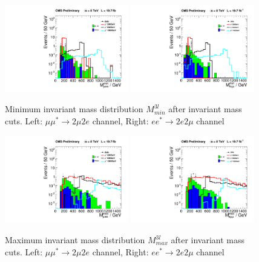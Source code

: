 \begin{figure}[hp!]
\begin{center}
\includegraphics[width=0.48\textwidth]{plot/Mmin_2mu2e.pdf} 
\includegraphics[width=0.48\textwidth]{plot/Mmin_2e2mu.pdf}
\end{center}
\caption{\label{fig:Mmin}Minimum invariant mass distribution $M_{min}^{3l}$ after invariant mass cuts. Left: $\mu\mu^{*}\rightarrow 2\mu2e$ channel, Right: $ee^{*}\rightarrow 2e2\mu$ channel}
\end{figure}


\begin{figure}[hp!]
\begin{center}
\includegraphics[width=0.48\textwidth]{plot/Mmax_2mu2e.pdf} 
\includegraphics[width=0.48\textwidth]{plot/Mmax_2e2mu.pdf}
\end{center}
\caption{\label{fig:Mmax}Maximum invariant mass distribution $M_{max}^{3l}$ after invariant mass cuts. Left: $\mu\mu^{*}\rightarrow 2\mu2e$ channel, Right: $ee^{*}\rightarrow 2e2\mu$ channel}
\end{figure}

\newpage
